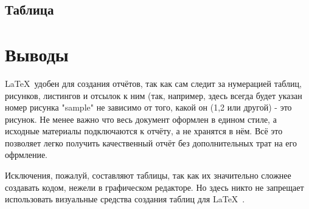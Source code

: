 

\subsection{Таблица}

\section{Выводы}
\LaTeX\ удобен для создания отчётов, так как сам следит за нумерацией таблиц, рисунков, листингов и отсылок к ним (так, например, здесь всегда будет указан номер рисунка "sample" не зависимо от того, какой он (1,2 или другой) - это рисунок. Не менее важно что весь документ оформлен в едином стиле, а исходные материалы подключаются к отчёту, а не хранятся в нём. Всё это позволяет легко получить качественный отчёт без дополнительных трат на его офрмление.

Исключения, пожалуй, составляют таблицы, так как их значительно сложнее создавать кодом, нежели в графическом редакторе. Но здесь никто не запрещает использовать визуальные средства создания таблиц для \LaTeX\ .

\newpage




